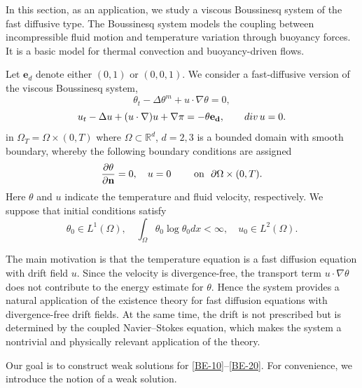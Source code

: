 \documentclass{amsart}
\numberwithin{equation}{section}
\newcommand{\R}{{ \mathbb{R}  }}
\begin{document}
In this section, as an application, we study a viscous Boussinesq system of the fast diffusive type. 
The Boussinesq system models the coupling between incompressible fluid motion and temperature variation through buoyancy forces. It is a basic model for thermal convection and buoyancy-driven flows.

Let \( \mathbf{e}_d \) denote either \( (0,1) \) or \( (0,0,1) \). 
We consider a fast-diffusive version of the viscous Boussinesq system,
\begin{equation}\label{BE-10}
\theta_t-\Delta \theta^m +u\cdot \nabla \theta=0,
\end{equation}
\begin{equation}\label{BE-20}
u_t-\Delta u+(u\cdot \nabla) u+\nabla \pi=-\theta {\bf{e}_d},\qquad {\rm div}\,u=0.
\end{equation}
in $\Omega_T=\Omega\times (0, T)$ where $\Omega\subset\R^d$, $d=2,3$ is a bounded domain with smooth boundary, whereby the following boundary conditions are assigned 
\begin{equation*}\label{BE-30}
\frac{\partial\theta}{\partial {\bf n}}=0,\quad u=0\qquad \mbox{ on }\,\,\partial\Omega\times (0,T).
\end{equation*}
Here $\theta$ and $u$ indicate the temperature and fluid velocity, respectively. 
We suppose that initial conditions satisfy
\begin{equation}\label{BE-40}
\theta_0\in L^1(\Omega),\quad \int_{\Omega} \theta_0 \log \theta_0 dx<\infty,\quad  u_0\in L^2(\Omega).
\end{equation}

The main motivation is that the temperature equation is a fast diffusion equation with drift field \(u\). Since the velocity is divergence-free, the transport term \(u\cdot\nabla\theta\) does not contribute to the energy estimate for \(\theta\). Hence the system provides a natural application of the existence theory for fast diffusion equations with divergence-free drift fields. At the same time, the drift is not prescribed but is determined by the coupled Navier--Stokes equation, which makes the system a nontrivial and physically relevant application of the theory.


Our goal is to construct weak solutions for \eqref{BE-10}--\eqref{BE-20}. 
For convenience, we introduce the notion of a weak solution.
\end{document}
